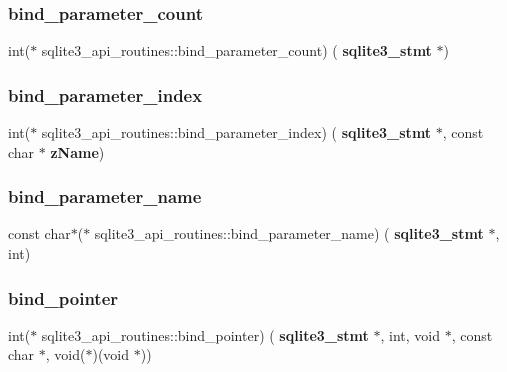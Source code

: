 \mbox{\label{structsqlite3__api__routines_acd345a944505eb7928568f01d7a4fe5a}} 
\subsubsection{bind\_parameter\_count}
{\footnotesize\ttfamily int($\ast$ sqlite3\+\_\+api\+\_\+routines\+::bind\+\_\+parameter\+\_\+count) (\textbf{ sqlite3\+\_\+stmt} $\ast$)}

\mbox{\label{structsqlite3__api__routines_af4ade5152fd51b1311463014b48dd05d}} 
\subsubsection{bind\_parameter\_index}
{\footnotesize\ttfamily int($\ast$ sqlite3\+\_\+api\+\_\+routines\+::bind\+\_\+parameter\+\_\+index) (\textbf{ sqlite3\+\_\+stmt} $\ast$, const char $\ast$\textbf{ z\+Name})}

\mbox{\label{structsqlite3__api__routines_a9d8e99fd21fd5929fc6c254060d8f83b}} 
\subsubsection{bind\_parameter\_name}
{\footnotesize\ttfamily const char$\ast$($\ast$ sqlite3\+\_\+api\+\_\+routines\+::bind\+\_\+parameter\+\_\+name) (\textbf{ sqlite3\+\_\+stmt} $\ast$, int)}

\mbox{\label{structsqlite3__api__routines_a4ef1b575694d6406ec4f6d81bceca20e}} 
\subsubsection{bind\_pointer}
{\footnotesize\ttfamily int($\ast$ sqlite3\+\_\+api\+\_\+routines\+::bind\+\_\+pointer) (\textbf{ sqlite3\+\_\+stmt} $\ast$, int, void $\ast$, const char $\ast$, void($\ast$)(void $\ast$))}

